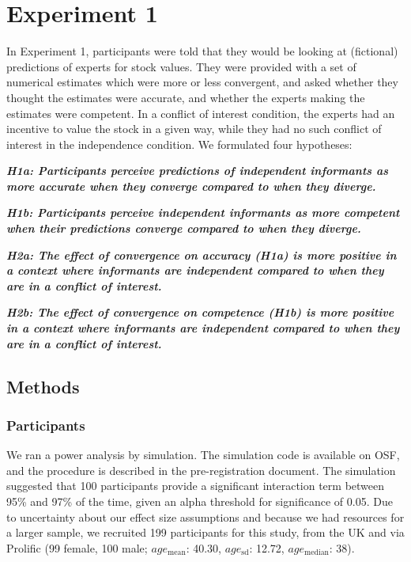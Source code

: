 \documentclass[
  doc,floatsintext]{apa6}
\begin{document}
\hypertarget{experiment-1}{%
\section{Experiment 1}\label{experiment-1}}

In Experiment 1, participants were told that they would be looking at (fictional) predictions of experts for stock values. They were provided with a set of numerical estimates which were more or less convergent, and asked whether they thought the estimates were accurate, and whether the experts making the estimates were competent. In a conflict of interest condition, the experts had an incentive to value the stock in a given way, while they had no such conflict of interest in the independence condition. We formulated four hypotheses:

\textbf{\emph{H1a: Participants perceive predictions of independent informants as more accurate when they converge compared to when they diverge.}}

\textbf{\emph{H1b: Participants perceive independent informants as more competent when their predictions converge compared to when they diverge.}}

\textbf{\emph{H2a: The effect of convergence on accuracy (H1a) is more positive in a context where informants are independent compared to when they are in a conflict of interest.}}

\textbf{\emph{H2b: The effect of convergence on competence (H1b) is more positive in a context where informants are independent compared to when they are in a conflict of interest.}}

\hypertarget{methods}{%
\subsection{Methods}\label{methods}}

\hypertarget{participants}{%
\subsubsection{Participants}\label{participants}}

We ran a power analysis by simulation. The simulation code is available on OSF, and the procedure is described in the pre-registration document. The simulation suggested that 100 participants provide a significant interaction term between 95\% and 97\% of the time, given an alpha threshold for significance of 0.05. Due to uncertainty about our effect size assumptions and because we had resources for a larger sample, we recruited 199 participants for this study, from the UK and via Prolific (99 female, 100 male; \(age_\text{mean}\): 40.30, \(age_\text{sd}\): 12.72, \(age_\text{median}\): 38).
\end{document}
